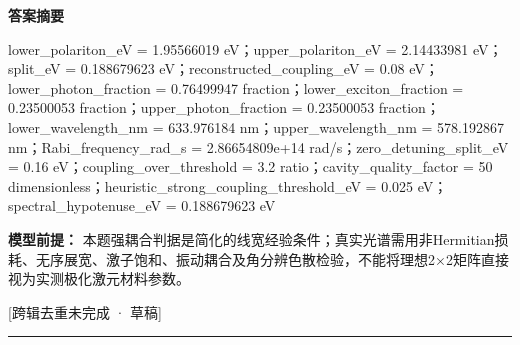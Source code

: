 \documentclass[UTF8,11pt,a4paper]{ctexart}
\begin{document}
\noindent\textbf{答案摘要}\par
lower\_polariton\_eV = 1.95566019 eV；upper\_polariton\_eV = 2.14433981 eV；split\_eV = 0.188679623 eV；reconstructed\_coupling\_eV = 0.08 eV；lower\_photon\_fraction = 0.76499947 fraction；lower\_exciton\_fraction = 0.23500053 fraction；upper\_photon\_fraction = 0.23500053 fraction；lower\_wavelength\_nm = 633.976184 nm；upper\_wavelength\_nm = 578.192867 nm；Rabi\_frequency\_rad\_s = 2.86654809e+14 rad/s；zero\_detuning\_split\_eV = 0.16 eV；coupling\_over\_threshold = 3.2 ratio；cavity\_quality\_factor = 50 dimensionless；heuristic\_strong\_coupling\_threshold\_eV = 0.025 eV；spectral\_hypotenuse\_eV = 0.188679623 eV\par
\noindent\textbf{模型前提：}
本题强耦合判据是简化的线宽经验条件；真实光谱需用非Hermitian损耗、无序展宽、激子饱和、振动耦合及角分辨色散检验，不能将理想2×2矩阵直接视为实测极化激元材料参数。\par
\noindent\textcolor{red!65!black}{[跨辑去重未完成 · 草稿]} \par
\medskip\hrule\medskip
{}
\end{document}
